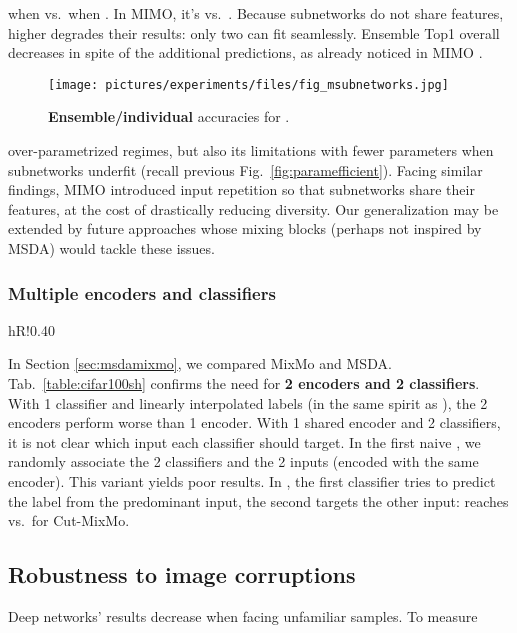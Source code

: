 \documentclass[10pt,twocolumn,letterpaper]{article}
\begin{document}
when  vs.\  when . In MIMO,
it's  vs.\ . Because subnetworks do not share features, higher
 degrades their results: only two can fit seamlessly.
Ensemble Top1 overall decreases in spite of the additional predictions, as already noticed in MIMO \cite{havasi2020raining}.\newpage
\begin{figure}[!h]\centering \texttt{[image: pictures/experiments/files/fig\_msubnetworks.jpg]}\vspace{-1.em}\caption{\textbf{Ensemble/individual} accuracies for .}\label{fig:msubnetworks}\end{figure}%
over-parametrized regimes, but also its limitations with fewer parameters
when subnetworks underfit (recall previous Fig.~\ref{fig:paramefficient}).
Facing similar findings, MIMO \cite{havasi2020raining} introduced input
repetition so that subnetworks share their features, at the cost of drastically
reducing diversity. Our generalization may be extended by future approaches whose mixing blocks (perhaps not inspired by MSDA) would tackle these issues.\subsubsection{Multiple encoders and classifiers}
\begin{wraptable}[10]{hR!}{0.40\linewidth}
\centering
\vspace{-1em}
\caption{\textnormal{Number of encoders/classifiers}.}
\vspace{-0.5em}
\label{table:cifar100sh}
\end{wraptable} \label{expe:differentencdec}
In Section \ref{sec:msdamixmo}, we compared MixMo and MSDA. Tab.~\ref{table:cifar100sh} confirms the need for \textbf{2 encoders and 2 classifiers}. With 1 classifier and linearly interpolated labels (in the same spirit as \cite{chen2020mclr}), the 2 encoders perform worse than 1 encoder. With 1 shared encoder and 2 classifiers, it is not clear which input each classifier should target. In the first naive , we randomly associate the 2 classifiers and the 2 inputs (encoded with the same encoder). This  variant yields poor results. In , the first classifier tries to predict the label from the predominant input, the second targets the other input:  reaches  vs.\  for Cut-MixMo.\subsection{Robustness to image corruptions}Deep networks' results decrease when facing unfamiliar samples. To measure
\end{document}

